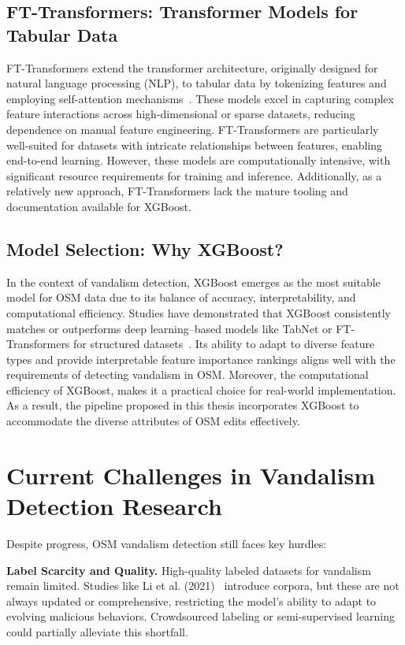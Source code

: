 \documentclass[
    13pt, %
    a4paper, %
    listof=totoc, %
    bibliography=totoc, %
    index=totoc, %
    headsepline
]{scrreprt}
\begin{document}
\subsection{FT-Transformers: Transformer Models for Tabular Data}
FT-Transformers extend the transformer architecture, originally designed for natural language processing (NLP), to tabular data by tokenizing features and employing self-attention mechanisms~\cite{Gorishniy2021}. These models excel in capturing complex feature interactions across high-dimensional or sparse datasets, reducing dependence on manual feature engineering. FT-Transformers are particularly well-suited for datasets with intricate relationships between features, enabling end-to-end learning. However, these models are computationally intensive, with significant resource requirements for training and inference. Additionally, as a relatively new approach, FT-Transformers lack the mature tooling and documentation available for XGBoost.

\subsection{Model Selection: Why XGBoost?}
In the context of vandalism detection, XGBoost emerges as the most suitable model for OSM data due to its balance of accuracy, interpretability, and computational efficiency. Studies have demonstrated that XGBoost consistently matches or outperforms deep learning–based models like TabNet or FT-Transformers for structured datasets~\cite{chen2016xgboost, Gorishniy2021}. Its ability to adapt to diverse feature types and provide interpretable feature importance rankings aligns well with the requirements of detecting vandalism in OSM. Moreover, the computational efficiency of XGBoost, makes it a practical choice for real-world implementation. As a result, the pipeline proposed in this thesis incorporates XGBoost to accommodate the diverse attributes of OSM edits effectively.


\section{Current Challenges in Vandalism Detection Research}

Despite progress, OSM vandalism detection still faces key hurdles:

\noindent
\textbf{Label Scarcity and Quality.}
High-quality labeled datasets for vandalism remain limited. Studies like Li et al. (2021)~\cite{Li2021} introduce corpora, but these are not always updated or comprehensive, restricting the model’s ability to adapt to evolving malicious behaviors. Crowdsourced labeling or semi-supervised learning could partially alleviate this shortfall.
\end{document}
